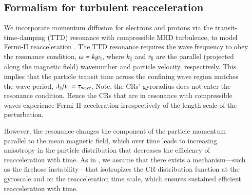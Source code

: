 \documentclass[fleqn,usenatbib,useAMS]{mnras}
\begin{document}


\subsection{Formalism for turbulent reacceleration}
\label{sec:reacc}

We incorporate momentum diffusion for electrons and protons via the
transit-time-damping (TTD) resonance with compressible MHD turbulence,
to model Fermi-II reacceleration \citep{brunetti07,brunetti11}. The
TTD resonance requires the wave frequency to obey the resonance
condition, $\omega=k_\parallel\varv_\parallel$, where $k_\parallel$
and $\varv_\parallel$ are the parallel (projected along the magnetic
field) wavenumber and particle velocity, respectively. This implies
that the particle transit time across the confining wave region
matches the wave period,
$\lambda_{\parallel}/\varv_{\parallel}=\tau_{\rmn{wave}}$. Note, the CRs'
gyroradius does not enter the resonance condition. Hence the CRs that
are in resonance with compressible waves experience Fermi-II
acceleration irrespectively of the length scale of the perturbation.

However, the resonance changes the component of the particle momentum
parallel to the mean magnetic field, which over time leads to
increasing anisotropy in the particle distribution that decreases the
efficiency of reacceleration with time. As in \citet{brunetti11}, we
assume that there exists a mechanism---such as the firehose
instability---that isotropizes the CR distribution function at the
gyroscale and on the reacceleration time scale, which ensures
sustained efficient reacceleration with time.
\end{document}
